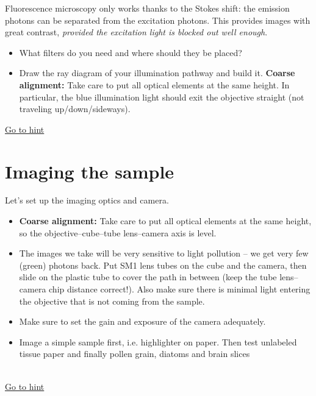 \documentclass[a4paper]{report}
\begin{document}
    Fluorescence microscopy only works thanks to the Stokes shift: the emission photons can be separated from the excitation photons. This provides images with great contrast, \emph{provided the excitation light is blocked out well enough}.
    \begin{itemize}
	    \item What filters do you need and where should they be placed?
	    \item Draw the ray diagram of your illumination pathway and build it. \textbf{Coarse alignment:} Take care to put all optical elements at the same height. In particular, the blue illumination light should exit the objective straight (not traveling up/down/sideways).
	\end{itemize}
	
	\hyperlink{hintTo-illumination}{Go to hint}
	\\
	
	
	\section{Imaging the sample}
	Let's set up the imaging optics and camera.
    \begin{itemize}
        \item \textbf{Coarse alignment:} Take care to put all optical elements at the same height, so the objective--cube--tube lens--camera axis is level.
        \item The images we take will be very sensitive to light pollution -- we get very few (green) photons back. Put SM1 lens tubes on the cube and the camera, then slide on the plastic tube to cover the path in between (keep the tube lens--camera chip distance correct!). Also make sure there is minimal light entering the objective that is not coming from the sample.
        \item Make sure to set the gain and exposure of the camera adequately.
        \item Image a simple sample first, i.e. highlighter on paper. Then test unlabeled tissue paper and finally pollen grain, diatoms and brain slices
        
    \end{itemize}
	\hypertarget{hintBack-imaging}{}
	
    
	\\
	\hyperlink{hintTo-imaging}{Go to hint}
	
\end{document}
